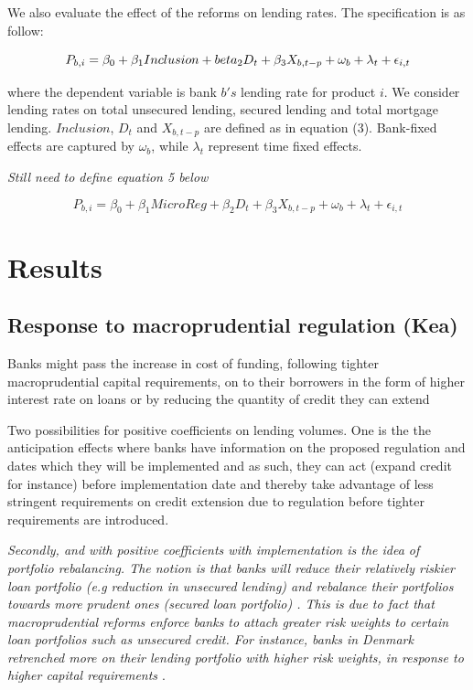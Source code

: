 \documentclass[
  letterpaper,
  DIV=11,
  numbers=noendperiod]{scrartcl}
\begin{document}
We also evaluate the effect of the reforms on lending rates. The
specification is as follow:

\begin{equation}
    P_{b,i}= \beta_{0}+\beta_{1}Inclusion+ \\beta_{2}D_{t}+\beta_{3}X_{b,t-p}+ \omega_{b}+ \lambda_{t}+\epsilon_{i,t}
\end{equation}

where the dependent variable is bank \(b's\) lending rate for product
\(i\). We consider lending rates on total unsecured lending, secured
lending and total mortgage lending. \(Inclusion\), \(D_{t}\) and
\(X_{b,t-p}\) are defined as in equation (3). Bank-fixed effects are
captured by \(\omega_{b}\), while \(\lambda_{t}\) represent time fixed
effects.

\textit{Still need to define equation 5 below}

\begin{equation}
    P_{b,i}= \beta_{0}+\beta_{1}MicroReg+ \beta_{2}D_{t}+\beta_{3}X_{b,t-p}+ \omega_{b}+ \lambda_{t}+\epsilon_{i,t}
\end{equation}

\hypertarget{results}{%
\section{Results}\label{results}}

\hypertarget{response-to-macroprudential-regulation-kea}{%
\subsection{Response to macroprudential regulation
(Kea)}\label{response-to-macroprudential-regulation-kea}}

Banks might pass the increase in cost of funding, following tighter
macroprudential capital requirements, on to their borrowers in the form
of higher interest rate on loans or by reducing the quantity of credit
they can extend \citep{noss2016estimating}

Two possibilities for positive coefficients on lending volumes. One is
the the anticipation effects where banks have information on the
proposed regulation and dates which they will be implemented and as
such, they can act (expand credit for instance) before implementation
date and thereby take advantage of less stringent requirements on credit
extension due to regulation before tighter requirements are introduced.

\textit{Secondly, and with positive coefficients with implementation is the idea of portfolio rebalancing. The notion is that banks will reduce their relatively riskier loan portfolio (e.g reduction in unsecured lending) and rebalance their portfolios towards more prudent ones (secured loan portfolio) \citep{deli2017real}. This is due to fact that macroprudential reforms enforce banks to attach greater risk weights to certain loan portfolios such as unsecured credit. For instance, banks in Denmark retrenched more on their lending portfolio with higher risk weights, in response to higher capital requirements \citep{imbierowicz2018time}}.
\end{document}
